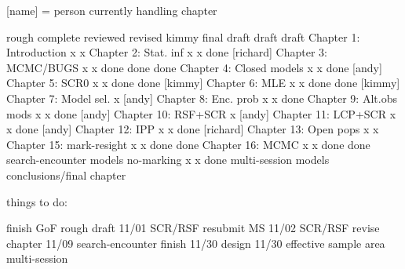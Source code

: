 [name] = person currently handling chapter


                          rough   complete reviewed  revised kimmy       final draft
                          draft    draft
Chapter 1: Introduction       x       x
Chapter 2: Stat. inf          x       x     done    [richard]
Chapter 3: MCMC/BUGS          x       x     done     done    done
Chapter 4: Closed models      x       x     done    [andy]
Chapter 5: SCR0               x       x     done     done   [kimmy]
Chapter 6: MLE                x       x     done     done   [kimmy]
Chapter 7: Model sel.         x     [andy]
Chapter 8: Enc. prob          x       x     done
Chapter 9: Alt.obs mods       x       x     done    [andy] 
Chapter 10: RSF+SCR           x    [andy]
Chapter 11: LCP+SCR           x       x     done    [andy]
Chapter 12: IPP               x       x     done    [richard]
Chapter 13: Open pops         x       x
Chapter 15: mark-resight      x       x     done     done 
Chapter 16: MCMC              x       x     done     done
search-encounter models
no-marking                    x       x     done
multi-session models
conclusions/final chapter





things to do:

finish GoF rough draft   11/01
SCR/RSF resubmit MS      11/02
SCR/RSF revise chapter   11/09
search-encounter finish  11/30
design                   11/30
effective sample area  
multi-session
